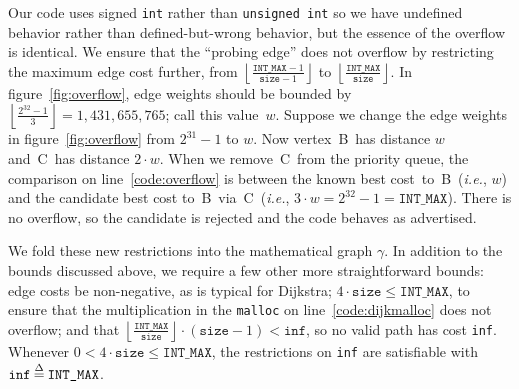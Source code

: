 Our code uses signed \texttt{int} rather than \texttt{unsigned int} so we have undefined behavior rather than defined-but-wrong behavior, but the essence of the overflow is identical.  We ensure that the ``probing edge'' does not overflow by restricting the maximum edge cost further, from $\left\lfloor\frac{\texttt{INT\_MAX}-1}{\texttt{size}-1}\right\rfloor$ to $\left\lfloor\frac{\texttt{INT\_MAX}}{\texttt{size}}\right\rfloor$.  In  figure~\ref{fig:overflow}, edge weights should be bounded by $\left\lfloor\frac{2^{32}-1}{3}\right\rfloor=1,\!431,\!655,\!765$; call this value~$w$.  Suppose we change the edge weights in figure~\ref{fig:overflow} from $2^{31}-1$ to $w$.  Now vertex~B~has distance $w$ and~C~has distance $2 \cdot w$.  When we remove~C~from the priority queue, the comparison on line~\ref{code:overflow} is between the known best cost~to~B~(\emph{i.e.}, $w$) and the candidate best cost to~B~via~C~(\emph{i.e.}, $3 \cdot w=2^{32} - 1 = \texttt{INT\_MAX}$).  There is no overflow, so the candidate is rejected and the code behaves as advertised.


We fold these new restrictions into the mathematical graph $\gamma$. %
In addition to the bounds discussed above, we require a few other more straightforward bounds: edge costs be non-negative, as is typical for Dijkstra; $4 \cdot \texttt{size} \le \texttt{INT\_MAX}$, to ensure that the multiplication in the \texttt{malloc} on line~\ref{code:dijkmalloc} does not overflow; and that $\left\lfloor \frac{\texttt{INT\_MAX}}{\texttt{size}}\right\rfloor \cdot (\texttt{size} - 1) < \texttt{inf}$, so no valid path has cost \texttt{inf}.  Whenever
$0 < 4 \cdot \texttt{size} \le \texttt{INT\_MAX}$, the restrictions on \texttt{inf} are satisfiable with $\texttt{inf} \mathbin{\stackrel{\Delta}{=}} \texttt{INT\_MAX}$.



